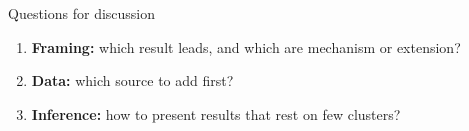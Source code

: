 \documentclass[aspectratio=169,10pt]{beamer}
\begin{document}
\begin{frame}{Questions for discussion}
\begin{enumerate}
\item \textbf{Framing:} which result leads, and which are mechanism or extension?
\item \textbf{Data:} which source to add first?
\item \textbf{Inference:} how to present results that rest on few clusters?
\end{enumerate}
\end{frame}
\end{document}
